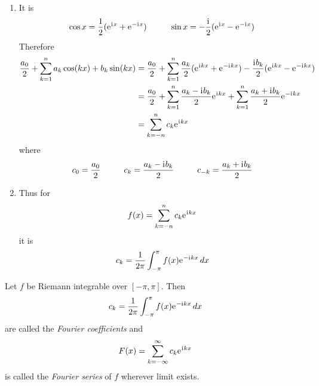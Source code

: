 \begin{remarks}\hfill
	\begin{enumerate}
		\item
		      It is
		      \[
			      \cos x = \frac{1}{2} (\mathrm{e}\mkern1mu^{\mathrm{i}\mkern1mu x} + \mathrm{e}\mkern1mu^{-\mathrm{i}\mkern1mu x}) \mspace{50mu}
			      \sin x = -\frac{\mathrm{i}\mkern1mu}{2} (\mathrm{e}\mkern1mu^{\mathrm{i}\mkern1mu x} - \mathrm{e}\mkern1mu^{-\mathrm{i}\mkern1mu x})
		      \]
		      Therefore
		      \[
			      \begin{split}
				      \frac{a_0}{2} + \sum_{k = 1}^n a_k \cos(kx) + b_k \sin(kx)
				      & = \frac{a_0}{2} + \sum_{k = 1}^n \frac{a_k}{2} (\mathrm{e}\mkern1mu^{\mathrm{i}\mkern1mu kx} + \mathrm{e}\mkern1mu^{-\mathrm{i}\mkern1mu kx}) -
				      \frac{\mathrm{i}\mkern1mu b_k}{2} (\mathrm{e}\mkern1mu^{\mathrm{i}\mkern1mu kx} - \mathrm{e}\mkern1mu^{-\mathrm{i}\mkern1mu kx}) \\
				      & = \frac{a_0}{2} + \sum_{k = 1}^n \frac{a_k - \mathrm{i}\mkern1mu b_k}{2} \mathrm{e}\mkern1mu^{\mathrm{i}\mkern1mu kx} +
				      \sum_{k=1}^n\frac{a_k + \mathrm{i}\mkern1mu b_k}{2} \mathrm{e}\mkern1mu^{-\mathrm{i}\mkern1mu kx} \\
				      & = \sum_{k=-n}^n c_k \mathrm{e}\mkern1mu^{\mathrm{i}\mkern1mu kx}
			      \end{split}
		      \]
		      where
		      \[
			      c_0 = \frac{a_0}{2} \mspace{50mu} c_k = \frac{a_k - \mathrm{i}\mkern1mu b_k}{2} \mspace{50mu} c_{-k} = \frac{a_k + \mathrm{i}\mkern1mu b_k}{2}
		      \]
		\item Thus for
		      \[
			      f(x) = \sum_{k=-n}^n c_k \mathrm{e}\mkern1mu^{\mathrm{i}\mkern1mu kx}
		      \]
		      it is
		      \[
			      c_k = \frac{1}{2\pi} \int_{-\pi}^\pi f(x) \mathrm{e}\mkern1mu^{-\mathrm{i}\mkern1mu kx}\,dx
		      \]

	\end{enumerate}
\end{remarks}
\bigskip


\begin{definition}
	Let \( f \) be Riemann integrable over \( [-\pi,\pi] \). Then
	\[
		c_k = \frac{1}{2\pi} \int_{-\pi}^\pi f(x) \mathrm{e}\mkern1mu^{-\mathrm{i}\mkern1mu kx}\,dx
	\]
	are called the \emph{Fourier coefficients} and
	\[
		F(x) = \sum_{k=-\infty}^\infty c_k \mathrm{e}\mkern1mu^{\mathrm{i}\mkern1mu kx}
	\]
	is called the \emph{Fourier series} of \( f\) wherever limit exists.
\end{definition}
\bigskip


